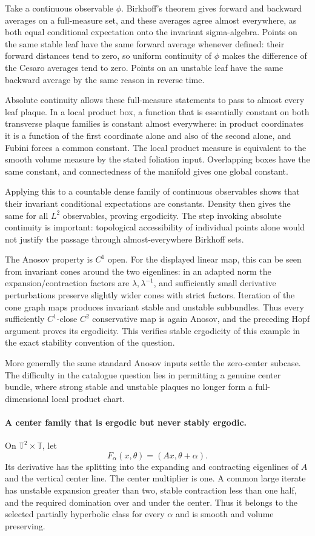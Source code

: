 \documentclass[11pt]{article}
\begin{document}
Take a continuous observable $\phi$. Birkhoff's theorem gives
forward and backward averages on a full-measure set, and these
averages agree almost everywhere, as both equal conditional
expectation onto the invariant sigma-algebra. Points on the same
stable leaf have the same forward average whenever defined: their
forward distances tend to zero, so uniform continuity of $\phi$
makes the difference of the Cesaro averages tend to zero. Points
on an unstable leaf have the same backward average by the same
reason in reverse time.

Absolute continuity allows these full-measure statements to pass
to almost every leaf plaque. In a local product box, a function
that is essentially constant on both transverse plaque families
is constant almost everywhere: in product coordinates it is a
function of the first coordinate alone and also of the second
alone, and Fubini forces a common constant. The local product
measure is equivalent to the smooth volume measure by the stated
foliation input. Overlapping boxes have the same constant, and
connectedness of the manifold gives one global constant.

Applying this to a countable dense family of continuous observables
shows that their invariant conditional expectations are constants.
Density then gives the same for all $L^2$ observables, proving
ergodicity. The step invoking absolute continuity is important:
topological accessibility of individual points alone would not
justify the passage through almost-everywhere Birkhoff sets.

The Anosov property is $C^1$ open. For the displayed linear map,
this can be seen from invariant cones around the two eigenlines:
in an adapted norm the expansion/contraction factors are
$\lambda,\lambda^{-1}$, and sufficiently small derivative
perturbations preserve slightly wider cones with strict factors.
Iteration of the cone graph maps produces invariant stable and
unstable subbundles. Thus every sufficiently $C^1$-close $C^2$
conservative map is again Anosov, and the preceding Hopf argument
proves its ergodicity. This verifies stable ergodicity of this
example in the exact stability convention of the question.

More generally the same standard Anosov inputs settle the
zero-center subcase. The difficulty in the catalogue question
lies in permitting a genuine center bundle, where strong stable
and unstable plaques no longer form a full-dimensional local
product chart.

\paragraph{A center family that is ergodic but never stably ergodic.}
On $\mathbb T^2\times\mathbb T$, let
\[
 F_\alpha(x,\theta)=(Ax,\theta+\alpha).
 \tag{388.1}
\]
Its derivative has the splitting into the expanding and contracting
eigenlines of $A$ and the vertical center line. The center multiplier
is one. A common large iterate has unstable expansion greater
than two, stable contraction less than one half, and the required
domination over and under the center. Thus it belongs to the
selected partially hyperbolic class for every $\alpha$ and is
smooth and volume preserving.
\end{document}
